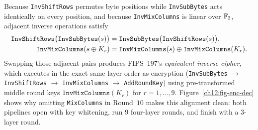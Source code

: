 Because \texttt{InvShiftRows} permutes byte positions while \texttt{InvSubBytes}
acts identically on every position, and because \texttt{InvMixColumns} is linear
over $\mathbb{F}_2$, adjacent inverse operations satisfy
\begin{align*}
\texttt{InvShiftRows}\bigl(\texttt{InvSubBytes}(s)\bigr)
  &= \texttt{InvSubBytes}\bigl(\texttt{InvShiftRows}(s)\bigr), \\
\texttt{InvMixColumns}(s \oplus K_r)
  &= \texttt{InvMixColumns}(s) \oplus \texttt{InvMixColumns}(K_r).
\end{align*}
Swapping those adjacent pairs produces FIPS~197's \emph{equivalent inverse cipher},
which executes in the exact same layer order as encryption
(\texttt{InvSubBytes} $\to$ \texttt{InvShiftRows} $\to$ \texttt{InvMixColumns} $\to$ \texttt{AddRoundKey})
using pre-transformed middle round keys $\texttt{InvMixColumns}(K_r)$ for
$r = 1,\dots,9$. Figure~\ref{ch12:fig-enc-dec} shows why omitting \texttt{MixColumns}
in Round~$10$ makes this alignment clean: both pipelines open with key whitening,
run $9$ four-layer rounds, and finish with a $3$-layer round.

